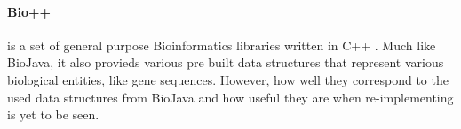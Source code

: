 \documentclass[a4paper,12pt]{report}
\begin{document}
\paragraph{Bio++}
is a set of general purpose Bioinformatics libraries written in C++ \autocite{bpp}. Much like BioJava, it also provieds various pre built data structures that represent various biological entities, like gene sequences. However, how well they correspond to the used data structures from BioJava and how useful they are when re-implementing is yet to be seen.

\subsubsubsection{}

\autocite{iHMMuneAlign}

\printbibliography
\end{document}
